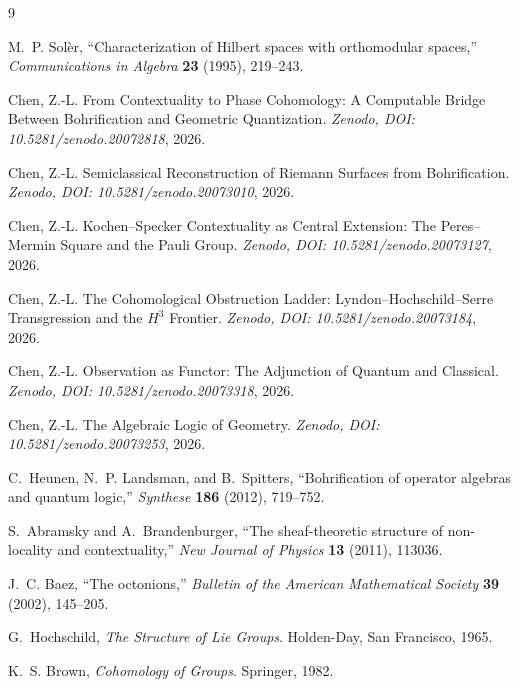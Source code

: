 \documentclass[11pt]{article}
\begin{document}
\begin{thebibliography}{9}

M.~P. Sol\`{e}r,
``Characterization of Hilbert spaces with orthomodular spaces,''
\textit{Communications in Algebra} \textbf{23} (1995), 219--243.

Chen, Z.-L.
From Contextuality to Phase Cohomology:
A Computable Bridge Between Bohrification and Geometric Quantization.
\textit{Zenodo, DOI: 10.5281/zenodo.20072818}, 2026.

Chen, Z.-L.
Semiclassical Reconstruction of Riemann Surfaces from Bohrification.
\textit{Zenodo, DOI: 10.5281/zenodo.20073010}, 2026.

Chen, Z.-L.
Kochen--Specker Contextuality as Central Extension: The Peres--Mermin Square and the Pauli Group.
\textit{Zenodo, DOI: 10.5281/zenodo.20073127}, 2026.

Chen, Z.-L.
The Cohomological Obstruction Ladder: Lyndon--Hochschild--Serre Transgression and the $H^3$ Frontier.
\textit{Zenodo, DOI: 10.5281/zenodo.20073184}, 2026.

Chen, Z.-L.
Observation as Functor: 
The Adjunction of Quantum and Classical.
\textit{Zenodo, DOI: 10.5281/zenodo.20073318}, 2026.

Chen, Z.-L.
The Algebraic Logic of Geometry.
\textit{Zenodo, DOI: 10.5281/zenodo.20073253}, 2026.

C.~Heunen, N.~P. Landsman, and B.~Spitters,
``Bohrification of operator algebras and quantum logic,''
\textit{Synthese} \textbf{186} (2012), 719--752.

S.~Abramsky and A.~Brandenburger,
``The sheaf-theoretic structure of non-locality and contextuality,''
\textit{New Journal of Physics} \textbf{13} (2011), 113036.

J.~C. Baez,
``The octonions,''
\textit{Bulletin of the American Mathematical Society} \textbf{39} (2002), 145--205.

G.~Hochschild,
\textit{The Structure of Lie Groups}.
Holden-Day, San Francisco, 1965.

K.~S. Brown,
\textit{Cohomology of Groups}.
Springer, 1982.

\end{thebibliography}
\end{document}
